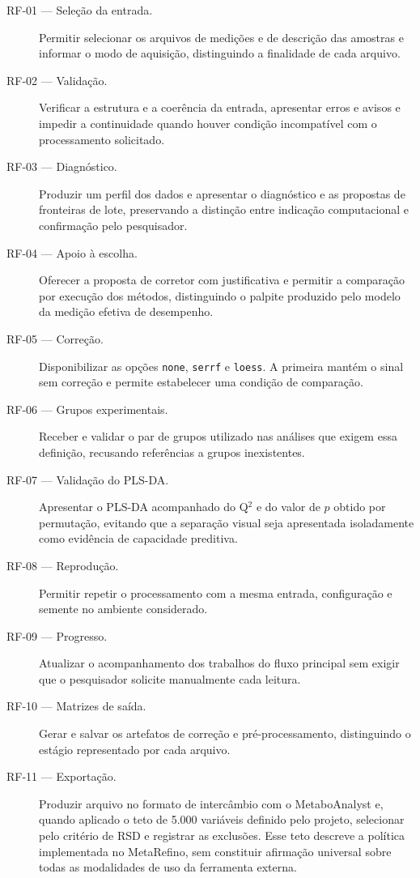 \begin{description}
\item[RF-01 --- Seleção da entrada.] Permitir selecionar os arquivos de medições e de descrição das amostras e informar o modo de aquisição, distinguindo a finalidade de cada arquivo.
\item[RF-02 --- Validação.] Verificar a estrutura e a coerência da entrada, apresentar erros e avisos e impedir a continuidade quando houver condição incompatível com o processamento solicitado.
\item[RF-03 --- Diagnóstico.] Produzir um perfil dos dados e apresentar o diagnóstico e as propostas de fronteiras de lote, preservando a distinção entre indicação computacional e confirmação pelo pesquisador.
\item[RF-04 --- Apoio à escolha.] Oferecer a proposta de corretor com justificativa e permitir a comparação por execução dos métodos, distinguindo o palpite produzido pelo modelo da medição efetiva de desempenho.
\item[RF-05 --- Correção.] Disponibilizar as opções \texttt{none}, \texttt{serrf} e \texttt{loess}. A primeira mantém o sinal sem correção e permite estabelecer uma condição de comparação.
\item[RF-06 --- Grupos experimentais.] Receber e validar o par de grupos utilizado nas análises que exigem essa definição, recusando referências a grupos inexistentes.
\item[RF-07 --- Validação do PLS-DA.] Apresentar o PLS-DA acompanhado do Q$^{2}$ e do valor de $p$ obtido por permutação, evitando que a separação visual seja apresentada isoladamente como evidência de capacidade preditiva.
\item[RF-08 --- Reprodução.] Permitir repetir o processamento com a mesma entrada, configuração e semente no ambiente considerado.
\item[RF-09 --- Progresso.] Atualizar o acompanhamento dos trabalhos do fluxo principal sem exigir que o pesquisador solicite manualmente cada leitura.
\item[RF-10 --- Matrizes de saída.] Gerar e salvar os artefatos de correção e pré-processamento, distinguindo o estágio representado por cada arquivo.
\item[RF-11 --- Exportação.] Produzir arquivo no formato de intercâmbio com o MetaboAnalyst e, quando aplicado o teto de 5.000 variáveis definido pelo projeto, selecionar pelo critério de RSD e registrar as exclusões. Esse teto descreve a política implementada no MetaRefino, sem constituir afirmação universal sobre todas as modalidades de uso da ferramenta externa.

\end{description}

